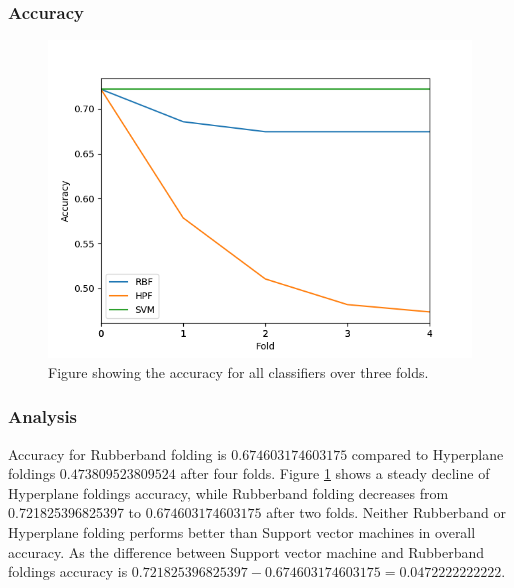 \documentclass[a4paper,twoside]{bth}
\begin{document}
\subsubsection{Accuracy}
\begin{figure}[!htb]
\centering
\includegraphics[scale=0.7]{images/result-hep/Accuracy.png}
   \caption{Figure showing the accuracy for all classifiers over three folds.}
   \label{fig:hep-accuracy}
\end{figure}

\FloatBarrier
\subsubsection{Analysis}
Accuracy for Rubberband folding is $0.674603174603175$ compared to Hyperplane foldings $0.473809523809524$ after four folds. Figure \ref{fig:hep-accuracy} shows a steady decline of Hyperplane foldings accuracy, while Rubberband folding decreases from 0.721825396825397 to $0.674603174603175$ after two folds. Neither Rubberband or Hyperplane folding performs better than Support vector machines in overall accuracy. As the difference between Support vector machine and Rubberband foldings accuracy is $0.721825396825397 - 0.674603174603175 = 0.0472222222222 $.\par

\clearpage
\FloatBarrier
\end{document}
